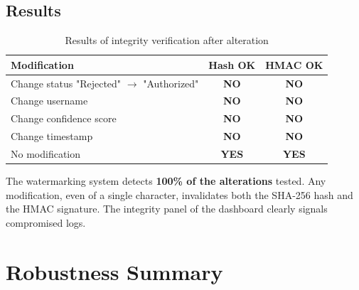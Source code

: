 \subsection{Results}

\begin{table}[H]
    \centering
    \begin{tabular}{lcc}
        \toprule
        \textbf{Modification} & \textbf{Hash OK} & \textbf{HMAC OK} \\
        \midrule
        Change status "Rejected" $\rightarrow$ "Authorized" & \textcolor{accentred}{\textbf{NO}} & \textcolor{accentred}{\textbf{NO}} \\
        Change username        & \textcolor{accentred}{\textbf{NO}} & \textcolor{accentred}{\textbf{NO}} \\
        Change confidence score & \textcolor{accentred}{\textbf{NO}} & \textcolor{accentred}{\textbf{NO}} \\
        Change timestamp       & \textcolor{accentred}{\textbf{NO}} & \textcolor{accentred}{\textbf{NO}} \\
        No modification        & \textcolor{accentgreen}{\textbf{YES}} & \textcolor{accentgreen}{\textbf{YES}} \\
        \bottomrule
    \end{tabular}
    \caption{Results of integrity verification after alteration}
\end{table}

\begin{successbox}[Analysis]
The watermarking system detects \textbf{100\% of the alterations} tested. Any modification, even of a single character, invalidates both the SHA-256 hash and the HMAC signature. The integrity panel of the dashboard clearly signals compromised logs.
\end{successbox}


\section{Robustness Summary}

